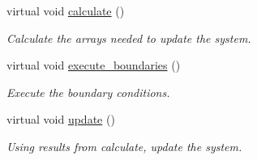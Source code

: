 \begin{DoxyCompactItemize}
virtual void \hyperlink{classelement_1_1element_ab152f3a61b1462b52796264b793624d5}{calculate} ()
\begin{DoxyCompactList}\small\item\em Calculate the arrays needed to update the system. \end{DoxyCompactList}\item 
virtual void \hyperlink{classelement_1_1element_aecaf33e0cdfafd9834c83c477e54227c}{execute\-\_\-boundaries} ()
\begin{DoxyCompactList}\small\item\em Execute the boundary conditions. \end{DoxyCompactList}\item 
virtual void \hyperlink{classelement_1_1element_a246d0cb12921e2e9dbdcf6139374f99e}{update} ()
\begin{DoxyCompactList}\small\item\em Using results from calculate, update the system. \end{DoxyCompactList}\end{DoxyCompactItemize}
